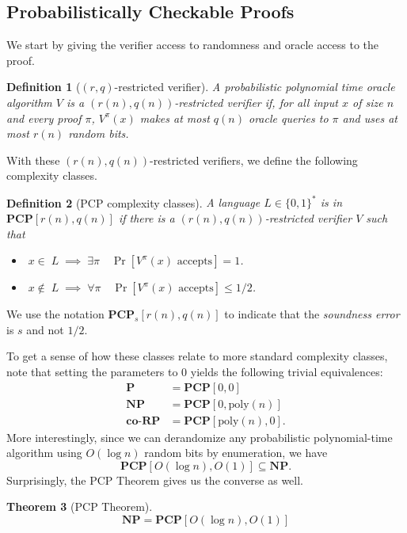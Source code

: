 \documentclass{article}
\newtheorem{theorem}{Theorem}
\newtheorem{definition}[theorem]{Definition}
\newcommand{\poly}{{\mathrm{poly}}}
\newcommand{\bits}{\{0,1\}}
\newcommand{\class}[1]{\mathbf{#1}}
\newcommand{\coclass}[1]{\mathbf{co\mbox{-}#1}} %
\newcommand{\NP}{\class{NP}}
\newcommand{\PCP}{\class{PCP}}
\newcommand{\coRP}{\coclass{RP}}
\renewcommand{\P}{\class{P}}
\begin{document}
%
%
%
%
%
%


\subsection{Probabilistically Checkable Proofs}

We start by giving the verifier access to randomness and oracle access to the
proof.

\begin{definition}[$(r, q)$-restricted verifier]
A probabilistic polynomial time oracle algorithm $V$ is a \emph{$(r(n), q(n))$-restricted verifier} if,
for all input $x$ of size $n$ and every proof $\pi$, $V^\pi(x)$ makes at most $q(n)$ oracle queries
to $\pi$ and uses at most $r(n)$ random bits.
\end{definition}

With these $(r(n), q(n))$-restricted verifiers, we define the following complexity classes.

\begin{definition}[PCP complexity classes]
A language $L\in\bits^*$ is in $\PCP[r(n), q(n)]$ if there is a
$(r(n), q(n))$-restricted verifier $V$ such that
\begin{itemize}[leftmargin=10em]
\item[\textbf{(Completeness)}] $\;x \in\; L \;\implies\; \exists \pi \quad \Pr[V^\pi(x) \text{ accepts}] = 1$.
\item[\textbf{(Soundness)}] $\;x \notin\; L \;\implies\; \forall \pi \quad \Pr[V^\pi(x) \text{ accepts}] \le 1/2$.
\end{itemize}
\end{definition}
We use the notation $\PCP_s[r(n), q(n)]$ to indicate that the \emph{soundness error} is $s$ and not $1/2$.

To get a sense of how these classes relate to more standard complexity classes,
note that setting the parameters to $0$ yields the following trivial equivalences:
\begin{align*}
\P &= \PCP[0, 0] \\
\NP &= \PCP[0, \poly(n)] \\
\coRP &= \PCP[\poly(n), 0].
\end{align*}
More interestingly, since we can derandomize any probabilistic polynomial-time algorithm
using $O(\log n)$ random bits by enumeration, we have
$$
\PCP[O(\log n), O(1)] \subseteq \NP.
$$
Surprisingly, the PCP Theorem gives us the converse as well.

\begin{theorem}[PCP Theorem]\label{pcp}
$$
\NP = \PCP[O(\log n), O(1)]
$$
\end{theorem}
\end{document}

